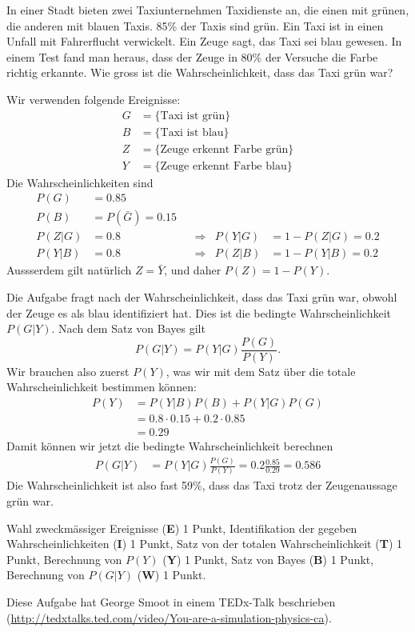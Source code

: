 In einer Stadt bieten zwei Taxiunternehmen Taxidienste an, die einen mit
grünen, die anderen mit blauen Taxis. 85\% der Taxis sind grün.
Ein Taxi ist in einen Unfall mit Fahrerflucht verwickelt.
Ein Zeuge sagt, das Taxi sei blau gewesen.
In einem Test fand man heraus, dass der Zeuge in 80\% der Versuche
die Farbe richtig erkannte.
Wie gross ist die Wahrscheinlichkeit, dass das Taxi grün war?


\begin{loesung}
Wir verwenden folgende Ereignisse:
\begin{align*}
G&=\{\text{Taxi ist grün}\}\\
B&=\{\text{Taxi ist blau}\}\\
Z&=\{\text{Zeuge erkennt Farbe grün}\}\\
Y&=\{\text{Zeuge erkennt Farbe blau}\}
\end{align*}
Die Wahrscheinlichkeiten sind
\begin{align*}
P(G)&=0.85\\
P(B)&=P(\bar G)=0.15\\
P(Z|G)&=0.8 &&\Rightarrow& P(Y|G)&=1-P(Z|G)=0.2\\
P(Y|B)&=0.8 &&\Rightarrow& P(Z|B)&=1-P(Y|B)=0.2
\end{align*}
Aussserdem gilt natürlich $Z=\bar Y$, und daher $P(Z)=1-P(Y)$.

Die Aufgabe fragt nach der Wahrscheinlichkeit, dass das Taxi grün war,
obwohl der Zeuge es als blau identifiziert hat.
Dies ist die bedingte Wahrscheinlichkeit $P(G|Y)$. Nach dem Satz von
Bayes gilt
\[
P(G|Y)=P(Y|G)\frac{P(G)}{P(Y)}.
\]
Wir brauchen also zuerst $P(Y)$, was wir mit dem Satz über die totale
Wahrscheinlichkeit bestimmen können:
\begin{align*}
P(Y)
&=
P(Y|B)P(B) + P(Y|G)P(G)\\
&=
0.8 \cdot 0.15 + 0.2 \cdot 0.85\\
&=0.29
\end{align*}
Damit können wir jetzt die bedingte Wahrscheinlichkeit berechnen
\begin{align*}
P(G|Y)
&=
P(Y|G)\frac{P(G)}{P(Y)}
=
0.2\frac{0.85}{0.29}
=
0.586
\end{align*}
Die Wahrscheinlichkeit ist also fast 59\%, dass das Taxi trotz der
Zeugenaussage grün war.
\end{loesung}

\begin{bewertung}
Wahl zweckmässiger Ereignisse ({\bf E}) 1 Punkt,
Identifikation der gegeben Wahrscheinlichkeiten ({\bf I}) 1 Punkt,
Satz von der totalen Wahrscheinlichkeit ({\bf T}) 1 Punkt,
Berechnung von $P(Y)$ ({\bf Y}) 1 Punkt,
Satz von Bayes ({\bf B}) 1 Punkt,
Berechnung von $P(G|Y)$ ({\bf W}) 1 Punkt.
\end{bewertung}

\begin{diskussion}
Diese Aufgabe hat George Smoot in einem TEDx-Talk beschrieben
(\url{http://tedxtalks.ted.com/video/You-are-a-simulation-physics-ca}).
\end{diskussion}

